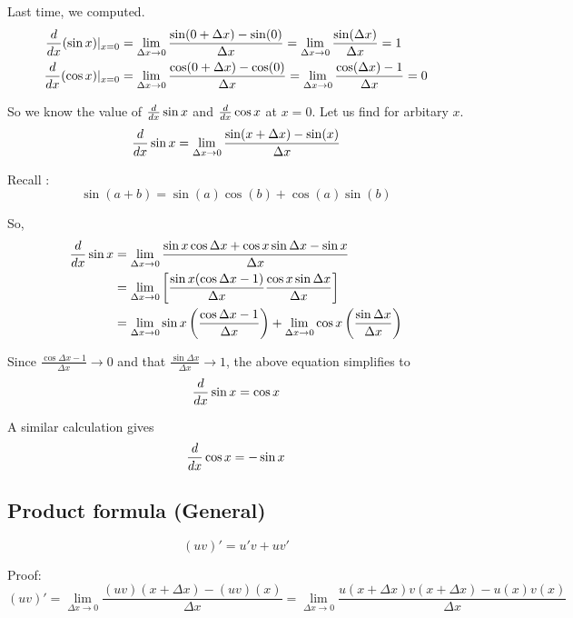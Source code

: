 Last time, we computed.
\begin{equation*}
\begin{split}
	\frac{d{}}{d{x}} (\sin x) |_{\substack{x=0}} & = 
		\lim_{\Delta x \to 0} \frac{\sin(0 + \Delta x) - \sin(0) }{\Delta x} = 
		\lim_{\Delta x \to 0} \frac{\sin(\Delta x)}{\Delta x} = 1 \\
	\frac{d{}}{d{x}} (\cos x) |_{\substack{x=0}} & = 
        \lim_{\Delta x \to 0} \frac{\cos(0 + \Delta x) - \cos(0) }{\Delta x} = 
        \lim_{\Delta x \to 0} \frac{\cos(\Delta x)-1}{\Delta x} = 0 \\
\end{split}
\end{equation*}

So we know the value of $\frac{d{}}{d{x}} \sin x$ and $\frac{d{}}{d{x}} \cos x$ at $x = 0$. Let us find for arbitary $x$. 
$$\frac{d{}}{d{x}} \sin x = \lim_{\Delta x \to 0} \frac{\sin(x+\Delta x) - \sin(x)}{\Delta x}$$

Recall : $$\sin(a+b) = \sin(a)\cos(b) + \cos(a)\sin(b)$$

So,
\begin{equation*}
\begin{split}
	\frac{d{}}{d{x}} \sin x 
		& = \lim_{\Delta x \to 0} \frac{\sin x \cos \Delta x + \cos x \sin \Delta x - \sin x}{\Delta x} \\
		& = \lim_{\Delta x \to 0} \left[ \frac{\sin x (\cos \Delta x - 1)}{\Delta x} \frac{\cos x \sin \Delta x}{\Delta x} \right] \\
		& = \lim_{\Delta x \to 0} \sin x \left( \frac{\cos \Delta x - 1}{\Delta x} \right) + \lim_{\Delta x \to 0} \cos x \left( \frac{\sin \Delta x}{\Delta x} \right)
\end{split}
\end{equation*}

Since $\frac{\cos \Delta x - 1}{\Delta x} \to 0$ and that $\frac{\sin \Delta x}{\Delta x} \to 1$, the above equation simplifies to $$\frac{d{}}{d{x}} \sin x = \cos x$$

A similar calculation gives
$$\frac{d{}}{d{x}} \cos x = - \sin x$$


\subsection{Product formula (General)}

$$(uv)' = u'v+uv'$$

Proof:
$$(uv)' = \lim_{\Delta x \to 0} \frac{(uv)(x+\Delta x) - (uv)(x)}{\Delta x}
		= \lim_{\Delta x \to 0} \frac{u(x+\Delta x)v(x+\Delta x) - u(x)v(x)}{\Delta x}$$

